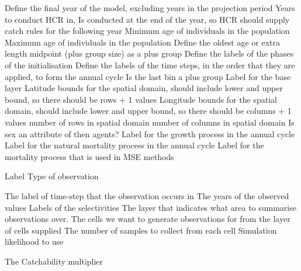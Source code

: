  {Define the final year of the model, excluding years in the projection period}
 {Years to conduct HCR in, Is conducted at the end of the year, so HCR should supply catch rules for the following year}
 {Minimum age of individuals in the population}
 {Maximum age of individuals in the population}
 {Define the oldest age or extra length midpoint (plus group size) as a plus group}
 {Define the labels of the phases of the initialisation}
 {Define the labels of the time steps, in the order that they are applied, to form the annual cycle}
 {}
 {Is the last bin a plus group}
 {Label for the base layer}
 {Latitude bounds for the spatial domain, should include lower and upper bound, so there should be rows + 1 values}
 {Longitude bounds for the spatial domain, should include lower and upper bound, so there should be columns + 1 values}
 {number of rows in spatial domain}
 {number of columns in spatial domain}
 {Is sex an attribute of then agents?}
 {Label for the growth process in the annual cycle}
 {Label for the natural mortality process in the annual cycle}
 {Label for the mortality process that is used in MSE methods}
\par\par
{} {Label}
 {Type of observation}
\par\textbf{}\par
{} {The label of time-step that the observation occurs in}
 {The years of the observed values}
 {Labels of the selectivities}
 {The layer that indicates what area to summarise observations over.}
 {The cells we want to generate observations for from the layer of cells supplied}
 {The number of samples to collect from each cell}
 {Simulation likelihood to use}
\par\textbf{}\par
{} {The Catchability multiplier}
